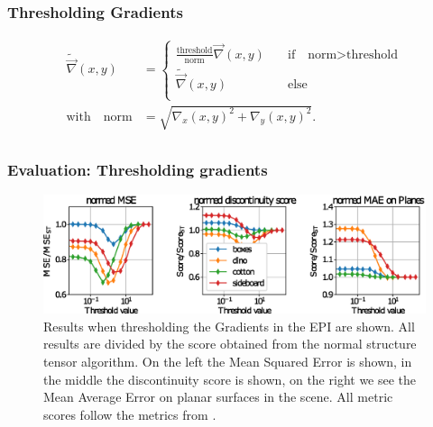 \documentclass[11pt]{beamer}
\begin{document}
\begin{frame}
\frametitle{Thresholding Gradients}
\begin{align}
\tilde{\vec \nabla}(x,y) &= \begin{cases}
\frac{\text{threshold}}{\text{norm}} \vec \nabla(x,y) \quad &\text{if}\quad \text{norm}> \text{threshold}\\
\tilde{\vec \nabla}(x,y)\qquad &\text{else}\\
\end{cases} \\
\text{with} \quad \text{norm} &= \sqrt{\nabla_x(x,y)^2 + \nabla_y(x,y)^2}.\\
\end{align}
\end{frame}

\begin{frame}
\frametitle{Evaluation: Thresholding gradients}
\begin{figure}
	\centering
	\includegraphics[width=1\linewidth]{images/thresh_params}
	\caption[Results when thresholding the Gradients in the EPI]{Results when thresholding the Gradients in the EPI are shown. All results are divided by the score obtained from the normal structure tensor algorithm. On the left the Mean Squared Error is shown, in the middle the discontinuity score is shown, on the right we see the Mean Average Error on planar surfaces in the scene. All metric scores follow the metrics from \cite{honauer2016benchmark}. }
	\label{fig:threshparams}
\end{figure}

\end{frame}
\end{document}
